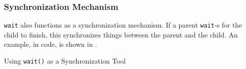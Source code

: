 \subsubsection{Synchronization Mechanism}\label{subsubsec:wait-Synchronization_Mechanism}
\texttt{wait} also functions as a synchronization mechanism.
If a parent  \texttt{wait}-s for the child to finish, this synchronizes things between the parent and the child.
An example, in code, is shown in .

\begin{listing}[h!tbp]
\caption{Using \texttt{wait()} as a Synchronization Tool}
\label{lst:wait_Sync}
\end{listing}

